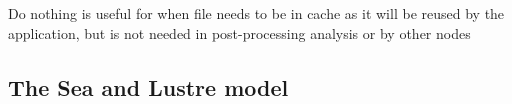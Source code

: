Do nothing is useful for when file needs to be in cache as it will be reused by the application, but 
is not needed in post-processing analysis or by other nodes


\subsection{The Sea and Lustre model}\label{model}

